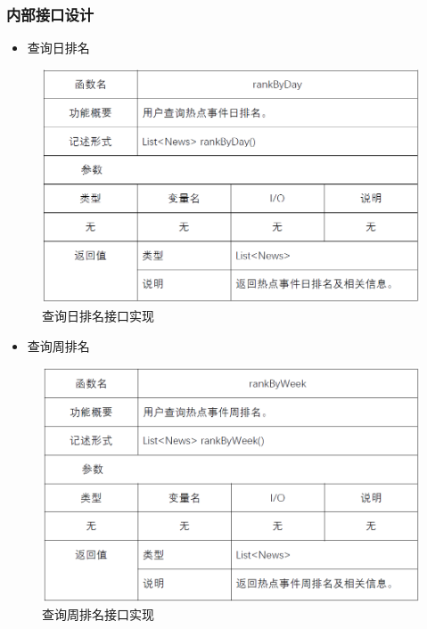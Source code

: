 \subsubsection{内部接口设计}
\begin{itemize}
	\item 查询日排名
\end{itemize}
\begin{figure}[!htbp]
	\centering
	\includegraphics[scale=0.75]{image/b18.png} %
	\caption{查询日排名接口实现} %
\end{figure}
\begin{itemize}
	\item 查询周排名
\end{itemize}
\begin{figure}[!htbp]
	\centering
	\includegraphics[scale=0.75]{image/b19.png} %
	\caption{查询周排名接口实现} %
\end{figure}
